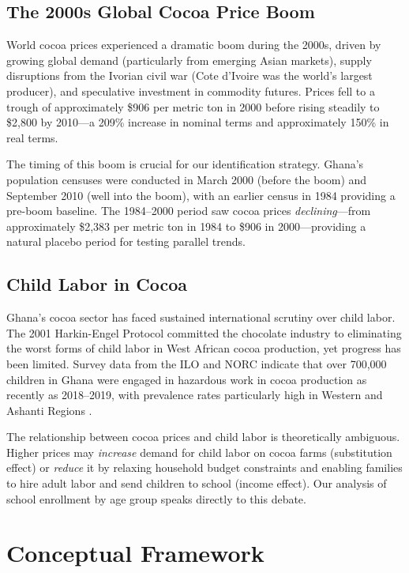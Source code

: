 \documentclass[12pt]{article}
\begin{document}
\subsection{The 2000s Global Cocoa Price Boom}

World cocoa prices experienced a dramatic boom during the 2000s, driven by growing global demand (particularly from emerging Asian markets), supply disruptions from the Ivorian civil war (Cote d'Ivoire was the world's largest producer), and speculative investment in commodity futures. Prices fell to a trough of approximately \$906 per metric ton in 2000 before rising steadily to \$2,800 by 2010---a 209\% increase in nominal terms and approximately 150\% in real terms.

The timing of this boom is crucial for our identification strategy. Ghana's population censuses were conducted in March 2000 (before the boom) and September 2010 (well into the boom), with an earlier census in 1984 providing a pre-boom baseline. The 1984--2000 period saw cocoa prices \textit{declining}---from approximately \$2,383 per metric ton in 1984 to \$906 in 2000---providing a natural placebo period for testing parallel trends.

\subsection{Child Labor in Cocoa}

Ghana's cocoa sector has faced sustained international scrutiny over child labor. The 2001 Harkin-Engel Protocol committed the chocolate industry to eliminating the worst forms of child labor in West African cocoa production, yet progress has been limited. Survey data from the ILO and NORC indicate that over 700,000 children in Ghana were engaged in hazardous work in cocoa production as recently as 2018--2019, with prevalence rates particularly high in Western and Ashanti Regions \citep{ilo2020, norc2020}.

The relationship between cocoa prices and child labor is theoretically ambiguous. Higher prices may \textit{increase} demand for child labor on cocoa farms (substitution effect) or \textit{reduce} it by relaxing household budget constraints and enabling families to hire adult labor and send children to school (income effect). Our analysis of school enrollment by age group speaks directly to this debate.


\section{Conceptual Framework}
\label{sec:framework}
\end{document}
